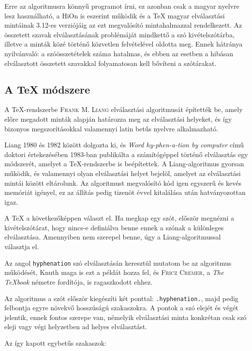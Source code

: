 \documentclass[12pt]{article}
\begin{document}
Erre az algoritmusra könnyű programot írni, ez azonban csak a magyar
nyelvre lesz használható, a HiOn is eszerint működik és a \TeX{} magyar
elválasztási mintáinak 3.12-es verziójáig az ezt megvalósító mintahalmazzal
rendelkezett. Az összetett szavak elválasztásának problémáját mindkettő
a szó kivételszótárba, illetve a minták közé történő közvetlen felvételével
oldotta meg. Ennek hátránya nyilvánvaló: a szóösszetételek száma hatalmas,
és ebben az esetben a hibásan elválasztott összetett szavakkal folyamatosan
kell bővíteni a szótárakat.


\subsection{A \TeX{} módszere}

A \TeX{}-rendszerbe \textsc{Frank M. Liang} elválasztási algoritmusát
építették be, amely előre megadott minták alapján határozza meg az
elválasztási helyeket, és így bizonyos megszorításokkal valamennyi
latin betűs nyelvre alkalmazható.

Liang 1980 és 1982 között dolgozta ki, és \emph{Word hy-phen-a-tion
by computer} című doktori értekezésében 1983-ban publikálta a számítógéppel
történő elválasztás egy módszerét, amelyet a \TeX{}-rendszerbe is
beépítettek. A Liang-algoritmus gyorsan működik, és valamennyi olyan
elválasztási helyet bejelöl, amelyet az elválasztási mintái között
eltárolunk. Az algoritmust megvalósító kód igen egyszerű és kevés
memóriát igényel, ez az állítás pedig tizenöt évvel kitalálása után
hatványozottan igaz.

A \TeX{} a következőképpen választ el. Ha megkap egy szót, először
megnézni a kivételszótárat, hogy nincs-e definiálva benne ennek a
szónak a különleges elválasztása. Amennyiben nem szerepel benne, úgy
a Liang-algoritmussal választja el.

Az angol \texttt{hyphenation} szó elválasztásán keresztül mutatom
be az algoritmus működését, Knuth maga is ezt a példát hozza fel,
és \textsc{Fricz Cremer}, a \emph{The \TeX{}book} németre fordítója,
is ragaszkodott ehhez.

Az algoritmus a szót először kiegészíti két ponttal: \texttt{.hyphenation.},
majd pedig felbontja egyre növekvő hosszúságú szakaszokra. A pontok
a szó elejét és végét jelentik, ennek fontos szerepe van, némelyik
elválasztási minta konkrétan csak szó eleji vagy végi helyzetben ad
helyes elválasztást.

Az így kapott egybetűs szakaszok:
\end{document}
